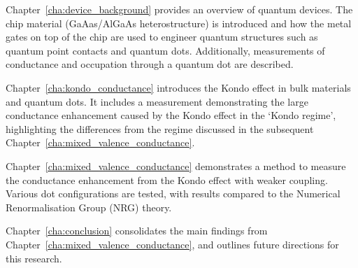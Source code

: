 Chapter~\ref{cha:device_background} provides an overview of quantum devices. The chip material (GaAas/AlGaAs heterostructure) is introduced and how the metal gates on top of the chip are used to engineer quantum structures such as quantum point contacts and quantum dots. Additionally, measurements of conductance and occupation through a quantum dot are described.


Chapter~\ref{cha:kondo_conductance} introduces the Kondo effect in bulk materials and quantum dots. It includes a measurement demonstrating the large conductance enhancement caused by the Kondo effect in the `Kondo regime', highlighting the differences from the regime discussed in the subsequent Chapter~\ref{cha:mixed_valence_conductance}.



Chapter~\ref{cha:mixed_valence_conductance} demonstrates a method to measure the conductance enhancement from the Kondo effect with weaker coupling. Various dot configurations are tested, with results compared to the Numerical Renormalisation Group (NRG) theory.



Chapter~\ref{cha:conclusion} consolidates the main findings from Chapter~\ref{cha:mixed_valence_conductance}, and outlines future directions for this research.